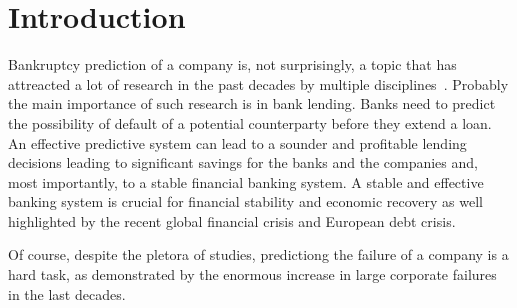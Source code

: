 \section{Introduction}
\label{sec:intro}

Bankruptcy prediction of a company is, not surprisingly, a topic that
has attreacted a lot of research in the past decades by multiple
disciplines~\cite{altman-bankruptcy-17,kumar-review-07,chen-bankruptcy-11,lee-bankruptcy-13,erdogan-bankruptcy-13,cho-bankruptcy-10,wang-bankruptcy-11,Altman-8,Ohlson-9,Begley-10,Lee-10a,Fernandez-11,Odom-13,Atiya-15,Wang-16}.
Probably the main importance of such research is in bank lending.
Banks need to predict the possibility of default of a potential
counterparty before they extend a loan.
An effective predictive system can lead to a sounder and profitable
lending decisions leading to significant savings for the
banks and the companies and, most importantly, to a stable financial
banking system.
A stable and effective banking system is crucial for
financial stability and economic recovery as well highlighted by the
recent global financial crisis and European debt crisis.


Of course, despite the pletora of studies, predictiong the failure of a
company is a hard task, as demonstrated by the 
enormous increase in large corporate failures in
the last decades.

%
%
%
%
%

